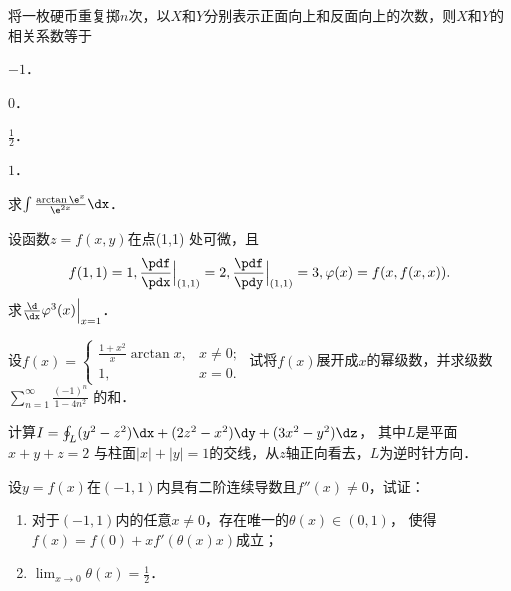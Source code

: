 \documentclass[plain,noanswer,medmath]{../../template/jnuexam}
\begin{document}
\begin{problem}
将一枚硬币重复掷$n$次，以$X$和$Y$分别表示正面向上和反面向上的次数，则$X$和$Y$的相关系数等于\pickout{}
\begin{abcd}
\item $- 1$．
\item $0$．
\item $\frac{1}{2}$．
\item $1$．
\end{abcd}
\end{problem}



\begin{problem}
求$\int \frac{\arctan \e^x}{\e^{2x}} \dx$．
\end{problem}



\begin{problem}
设函数$z = f(x,y)$在点(1,1) 处可微，且
$$f(1,1) = 1,\frac{\pdf}{\pdx}\Big|_{(1,1)} = 2,\frac{\pdf}{\pdy}\Big|_{(1,1)} = 3,\varphi(x) = f(x,f(x,x)).$$
求$\frac{\d}{\dx}\varphi^3(x)\Big|_{x = 1}$．
\end{problem}



\begin{problem}
设$f(x) = \begin{cases}
  \frac{1 + x^2}{x}\arctan x, & x \ne 0; \\
                           1, & x = 0.
\end{cases}$ 试将$f(x)$展开成$x$的幂级数，并求级数$\sum_{n = 1}^{\infty}\frac{(- 1)^n}{1 - 4n^2}$ 的和．
\end{problem}



\begin{problem}
计算$I = \oint_L (y^2 - z^2) \dx + (2z^2 - x^2)\dy + (3x^2 - y^2)\dz$，
其中$L$是平面$x + y + z = 2$ 与柱面$|x| + |y| = 1$的交线，从$z$轴正向看去，$L$为逆时针方向．
\end{problem}



\begin{problem}
设$y = f(x)$在$(- 1,1)$内具有二阶连续导数且$f''(x) \ne 0$，试证：
\begin{enumerate}
\item 对于$(- 1,1)$内的任意$x \ne 0$，存在唯一的$\theta (x) \in \left(0,1 \right)$，
      使得\goodbreak $f(x) = f(0) + xf'\left(\theta(x)x \right)$成立；
\item $\lim_{x \to 0} \theta(x) = \frac{1}{2}$．
\end{enumerate}
\end{problem}
\end{document}
